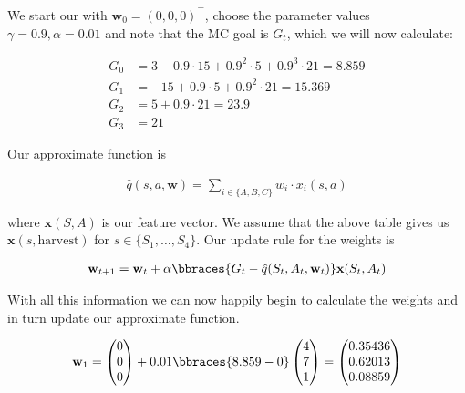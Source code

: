 \begin{solution}

We start our with $\textbf{w}_0 = (0,0,0)^\top$, choose the parameter values $\gamma = 0.9 , \alpha = 0.01$ and note that the MC goal is $G_t$, which we will now calculate:

\begin{align*}
  G_0
  &=
  3 - 0.9\cdot 15 + 0.9^2\cdot 5 + 0.9^3 \cdot 21 = 8.859\\
  G_1
  &=
  -15 + 0.9 \cdot 5 + 0.9^2 \cdot 21 = 15.369 \\
  G_2
  &=
  5 + 0.9\cdot 21 = 23.9 \\
  G_3
  &=
  21
\end{align*}

Our approximate function is

\begin{align*}
  \hat{q}(s,a,\textbf{w})
  =
  \sum_{i \in \{A,B,C\}} w_i \cdot x_i(s,a)
\end{align*}

where $\textbf{x}(S,A)$ is our feature vector. We assume that the above table gives us $\textbf{x}(s,\text{harvest})$ for $s \in \{S_1,\dots,S_4\}$. Our update rule for the weights is

\begin{align*}
  \textbf{w}_{t+1}
  =
  \textbf{w}_t + \alpha \bbraces{G_t - \hat{q}(S_t,A_t,\textbf{w}_t)}\textbf{x}(S_t,A_t)
\end{align*}

With all this information we can now happily begin to calculate the weights and in turn update our approximate function.

\begin{align*}
  \textbf{w}_1
  =
  \begin{pmatrix}
    0 \\
    0 \\
    0
  \end{pmatrix}
  +
  0.01\bbraces{8.859 - 0}
  \begin{pmatrix}
    4 \\
    7 \\
    1
  \end{pmatrix}
  =
  \begin{pmatrix}
    0.35436 \\
    0.62013 \\
    0.08859
  \end{pmatrix}
\end{align*}


\end{solution}
